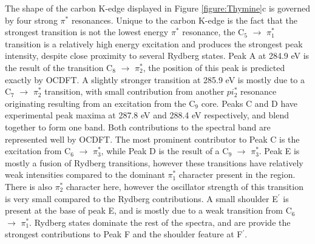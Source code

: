 \documentclass[12pt]{article}
\begin{document}
   The shape of the carbon K-edge displayed in Figure \ref{figure:Thymine}c is governed by four strong $\pi^*$ resonances. Unique to the carbon K-edge is the fact that the strongest transition is not the lowest energy $\pi^*$ resonance, the C$_5$ $\rightarrow$ $\pi_1^*$ transition is a relatively high energy excitation and produces the strongest peak intensity, despite close proximity to several Rydberg states. Peak A at 284.9 eV is the result of the transition C$_8$ $\rightarrow$ $\pi_2^*$, the position of this peak is predicted exactly by OCDFT. A slightly stronger transition at 285.9 eV is mostly due to a  C$_7$ $\rightarrow$ $\pi_2^*$ transition, with small contribution from another $pi_2^*$ resonance originating resulting from an excitation from the C$_9$ core. Peaks C and D have experimental peak maxima at 287.8 eV and 288.4 eV respectively, and blend together to form one band. Both contributions to the spectral band are represented well by OCDFT. The most prominent contributor to Peak C is the excitation from C$_6$ $\rightarrow$ $\pi^*_3$, while Peak D is the result of a C$_9$ $\rightarrow$ $\pi^*_3$. Peak E is mostly a fusion of Rydberg transitions, however these transitions have relatively weak intensities compared to the dominant $\pi_1^*$ character present in the region. There is also $\pi^*_2$ character here, however the oscillator strength of this transition is very small compared to the Rydberg contributions. A small shoulder E$^{\prime}$ is present at the base of peak E, and is mostly due to a weak transition from C$_6$ $\rightarrow$ $\pi_1^*$.  Rydberg states dominate the rest of the spectra, and are provide the strongest contributions to Peak F and the shoulder feature at F$^{\prime}$.
\\ \\
\end{document}
